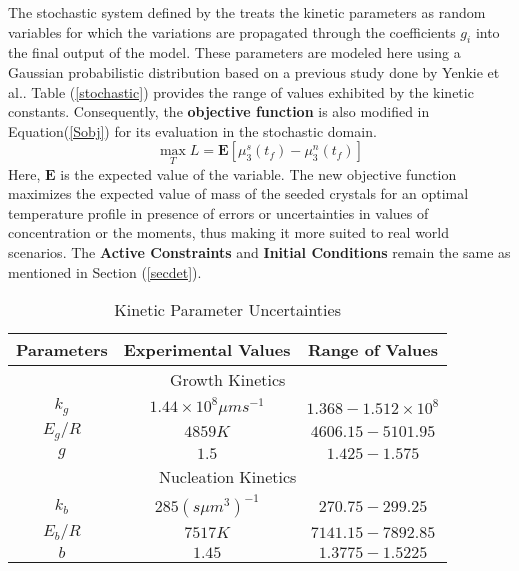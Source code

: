 \documentclass[3p,times]{elsarticle}
\begin{document}
The stochastic system defined by the  treats the kinetic parameters as random variables for which the variations are propagated through the coefficients $g_{i}$ into the final output of the model. These parameters are modeled here using a Gaussian probabilistic distribution based on a previous study done by Yenkie et al.\cite{yenkie}. Table (\ref{stochastic}) provides the range of values exhibited by the kinetic constants. Consequently, the \textbf{objective function} is also modified in Equation(\ref{Sobj}) for its evaluation in the stochastic domain.   
\begin{equation} \label{Sobj}
\max_{T} L = \mathbf{E}\left[ \mu_{3}^{s}(t_{f}) - \mu_{3}^{n}(t_{f})\right]
\end{equation}
Here, $\mathbf{E}$ is the expected value of the variable. The new objective function
maximizes the expected value of mass of the seeded crystals for an optimal temperature profile in presence of errors or uncertainties in values of concentration or the moments, thus making it more suited to real world scenarios. The \textbf{Active Constraints} and \textbf{Initial Conditions} remain the same as mentioned in Section (\ref{secdet}).

\begin{center}
\begin{table}[!h] \label{stochastic}
\centering
\caption{Kinetic Parameter Uncertainties\cite{hu,shi,paeng}}
\begin{tabular}{|c|c|c|} 
\hline
Parameters & Experimental Values & Range of Values\\
\hline
\multicolumn{3}{|c|}{Growth Kinetics} \\
\hline
$k_{g}$ & $1.44\times10^{8} \mu m s^{-1}$ & $1.368 - 1.512\times10^{8} $\\
$E_{g}/R$ & $4859K$ & $4606.15-5101.95$\\
$g$ & $1.5$ & $1.425-1.575$\\
\hline
\multicolumn{3}{|c|}{Nucleation Kinetics} \\
\hline
$k_{b}$ & $285 (s \mu m^{3})^{-1}$ & $270.75-299.25$\\ 
$E_{b}/R$ & $7517K$ & $7141.15-7892.85$\\
$b$ & $1.45$ & $1.3775-1.5225$\\
\hline
\end{tabular}

\label{Table3}
\end{table}
\end{center}
\end{document}
